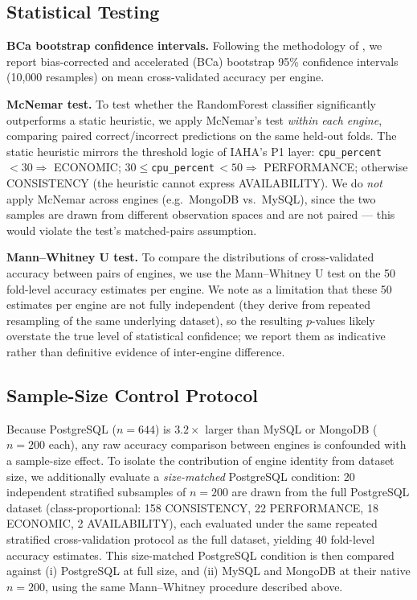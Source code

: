 \documentclass[pdflatex,sn-mathphys-num]{sn-jnl}
\theoremstyle{thmstyleone}
\theoremstyle{thmstylethree}
\begin{document}
\subsection{Statistical Testing}\label{subsec:stats}

\textbf{BCa bootstrap confidence intervals.} Following the
methodology of \cite{iaha2026}, we report bias-corrected and
accelerated (BCa) bootstrap 95\% confidence intervals (10{,}000
resamples) on mean cross-validated accuracy per engine.

\textbf{McNemar test.} To test whether the RandomForest classifier
significantly outperforms a static heuristic, we apply McNemar's test
\emph{within each engine}, comparing paired correct/incorrect
predictions on the same held-out folds. The static heuristic mirrors
the threshold logic of IAHA's P1 layer: \texttt{cpu\_percent}\,$<30 \Rightarrow$
ECONOMIC; $30\leq$\texttt{cpu\_percent}\,$<50 \Rightarrow$ PERFORMANCE;
otherwise CONSISTENCY (the heuristic cannot express AVAILABILITY).
We do \emph{not} apply McNemar across engines (e.g.\ MongoDB vs.\
MySQL), since the two samples are drawn from different observation
spaces and are not paired --- this would violate the test's
matched-pairs assumption.

\textbf{Mann--Whitney U test.} To compare the distributions of
cross-validated accuracy between pairs of engines, we use the
Mann--Whitney U test on the 50 fold-level accuracy estimates per
engine. We note as a limitation that these 50 estimates per engine are
not fully independent (they derive from repeated resampling of the
same underlying dataset), so the resulting $p$-values likely overstate
the true level of statistical confidence; we report them as indicative
rather than definitive evidence of inter-engine difference.

\subsection{Sample-Size Control Protocol}\label{subsec:sizecontrol-protocol}

Because PostgreSQL ($n=644$) is $3.2\times$ larger than MySQL or
MongoDB ($n=200$ each), any raw accuracy comparison between engines is
confounded with a sample-size effect. To isolate the contribution of
engine identity from dataset size, we additionally evaluate a
\emph{size-matched} PostgreSQL condition: 20 independent stratified
subsamples of $n=200$ are drawn from the full PostgreSQL dataset
(class-proportional: 158 CONSISTENCY, 22 PERFORMANCE, 18 ECONOMIC, 2
AVAILABILITY), each evaluated under the same repeated stratified
cross-validation protocol as the full dataset, yielding 40 fold-level
accuracy estimates. This size-matched PostgreSQL condition is then
compared against (i) PostgreSQL at full size, and (ii) MySQL and
MongoDB at their native $n=200$, using the same Mann--Whitney
procedure described above.
\end{document}
